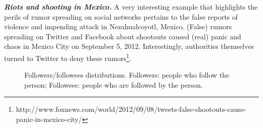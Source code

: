 \noindent
\textbf{\emph{Riots and shooting in Mexico.}}
A very interesting example that highlights the perils of rumor spreading on social networks pertains to the false reports of violence and impending attack
in Nezahualcoyotl, %
Mexico. (False) rumors spreading on Twitter and Facebook
about shootouts caused (real) panic and chaos in Mexico City
on September 5, 2012. Interestingly, authorities themselves
turned to Twitter to deny
these rumors\footnote{http://www.foxnews.com/world/2012/09/08/tweets-false-shootouts-cause-panic-in-mexico-city/}.



\begin{figure}[t]
\centering
{}
\vspace{-1em}
\caption{Followers/followees distributions. Followers: people who follow the person; Followees: people who are followed by the person.}
\label{fig:Followers}
\end{figure}

